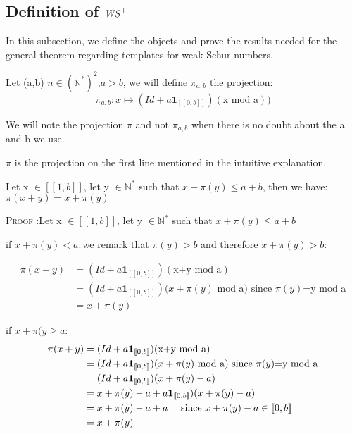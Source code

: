 \subsection{Definition of \(\mathit{WS}^+\)}

In this subsection, we define the objects and prove the results needed for the general theorem regarding templates for
weak Schur numbers.

\begin{definition}

Let (a,b) \(n \in (\mathbb{N}^*)^2\),\(a>b\), we will define \(\pi_{a,b}\) the projection:
\[ \pi_{a,b}:x \longmapsto (Id+a\mathbf{1}_{ [\![0,b]\!]})(\text{x mod a}))\]
\end{definition}

We will note  the projection \(\pi\) and not \(\pi_{a,b}\) when there is no doubt about the a and b we use.

\begin{remark}
\(\pi\) is the projection on the first line mentioned in the intuitive explanation.
\end{remark}

\begin{proposition}
Let x \(\in [\![1,b]\!]\), let y \(\in \mathbb{N}^*\) such that \(x+\pi(y)\leqslant a+b\), then we have: \(\pi(x+y)=x+\pi(y)\)
\end{proposition}

\textsc{Proof :}Let x \(\in [\![1,b]\!]\), let y \(\in \mathbb{N}^*\) such that \(x+\pi(y)\leqslant a+b\)

if \(x+\pi(y)< a:\)we remark that \(\pi(y)>b\) and therefore \(x+\pi(y)>b\):

\begin{align*}
 \pi(x+y) & = (Id+a\mathbf{1}_{ [\![0,b]\!]})(\text{x+y mod a})\\
& = (Id+a\mathbf{1}_{ [\![0,b]\!]})(x+\pi(y)\text{ mod a) since } \pi(y)\text{=y mod a} \\
& =x+ \pi(y)
\end{align*}

if \(x+\pi(y\geqslant a\):
\begin{align*}
 \pi(x+y) & = (Id+a\mathbf{1}_{ [\![0,b]\!]})(\text{x+y mod a})\\
& = (Id+a\mathbf{1}_{ [\![0,b]\!]})(x+\pi(y)\text{ mod a) since } \pi(y)\text{=y mod a} \\
& = (Id+a\mathbf{1}_{ [\![0,b]\!]})(x+\pi(y) - a) \\
& = x+\pi(y) - a +a\mathbf{1}_{ [\![0,b]\!]})(x+\pi(y) - a) \\
& = x+\pi(y) - a +a \text{ \quad since } x+\pi(y) - a \in [\![0,b]\!] \\
& = x+\pi(y)
\end{align*}


